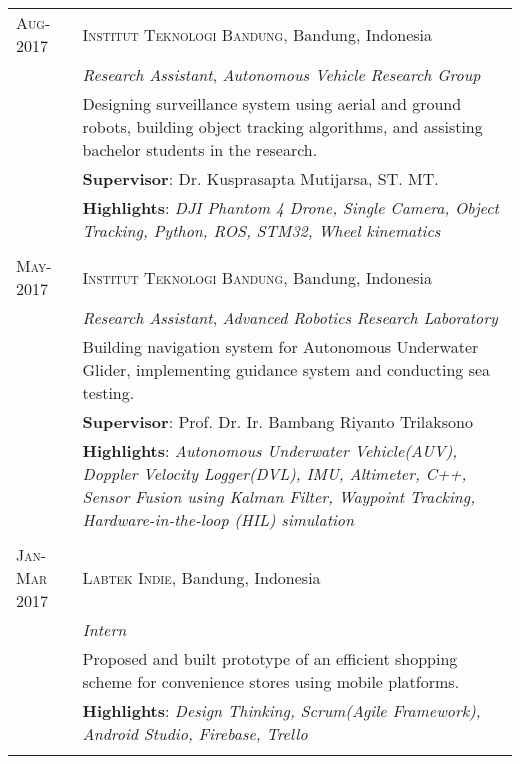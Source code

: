 \documentclass[a4paper,10pt]{article} %
\begin{document}
\begin{tabular}{lp{12cm}}
\textsc{Aug- 2017} & \textsc{Institut Teknologi Bandung}, Bandung, Indonesia \\
& \emph{Research Assistant}, \textit{Autonomous Vehicle Research Group}\\ 
& \footnotesize{Designing surveillance system using aerial and ground robots, building object tracking algorithms, and assisting bachelor students in the research.}\\
& \footnotesize{\textbf{Supervisor}: Dr. Kusprasapta Mutijarsa, ST. MT.}\\
& \footnotesize{\textbf{Highlights}: \textit{DJI Phantom 4 Drone, Single Camera, Object Tracking, Python, ROS, STM32, Wheel kinematics}}\\
\multicolumn{2}{c}{} \\


\textsc{May- 2017} & \textsc{Institut Teknologi Bandung}, Bandung, Indonesia \\
& \emph{Research Assistant}, \textit{Advanced Robotics Research Laboratory}\\ 
& \footnotesize{Building navigation system for Autonomous Underwater Glider, implementing guidance system and conducting sea testing.}\\
& \footnotesize{\textbf{Supervisor}: Prof. Dr. Ir. Bambang Riyanto Trilaksono}\\
& \footnotesize{\textbf{Highlights}: \textit{Autonomous Underwater Vehicle(AUV), Doppler Velocity Logger(DVL), IMU, Altimeter, C++, Sensor Fusion using Kalman Filter, Waypoint Tracking, Hardware-in-the-loop (HIL) simulation}}\\
\multicolumn{2}{c}{} \\


\textsc{Jan-Mar 2017} & \textsc{Labtek Indie}, Bandung, Indonesia \\
& \emph{Intern}\\ 
& \footnotesize{Proposed and built prototype of an efficient shopping scheme for convenience stores using mobile platforms.}\\
& \footnotesize{\textbf{Highlights}: \textit{Design Thinking, Scrum(Agile Framework), Android Studio, Firebase, Trello}}\\
\multicolumn{2}{c}{} \\


\end{tabular}
\end{document}
